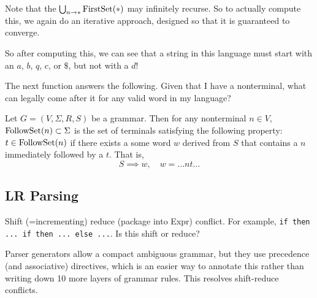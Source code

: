   Note that the $\bigcup_{n \to \ast} \operatorname*{FirstSet}(\ast)$ may infinitely recurse. So to actually compute this, we again do an iterative approach, designed so that it is guaranteed to converge. 
  
  \begin{algo}
    
  \end{algo}

  \begin{example}
    \label{ex:reading-off-the-legal-first-symbols}
    So after computing this, we can see that a string in this language must start with an $a$, $b$, $q$, $c$, or $\$$, but not with a $d$!
  \end{example}

  The next function answers the following. Given that I have a nonterminal, what can legally come after it for any valid word in my language? 

  \begin{definition}
    \label{def:follow-set}
    Let $G = (V, \Sigma, R, S)$ be a grammar. Then for any nonterminal $n \in V$, $\operatorname*{FollowSet}(n) \subset \Sigma$ is the set of terminals satisfying the following property: $t \in \operatorname*{FollowSet}(n)$ if there exists a some word $w$ derived from $S$ that contains a $n$ immediately followed by a $t$. That is, 
    \begin{equation}
      S \implies w, \quad w = \ldots nt \ldots
    \end{equation}
  \end{definition}

\subsection{LR Parsing}

  Shift (=incrementing) reduce (package into Expr) conflict. For example, \texttt{if then ... if then ... else ...}. Is this shift or reduce? 

  Parser generators allow a compact ambiguous grammar, but they use precedence (and associative) directives, which is an easier way to annotate this rather than writing down 10 more layers of grammar rules. This resolves shift-reduce conflicts. 

